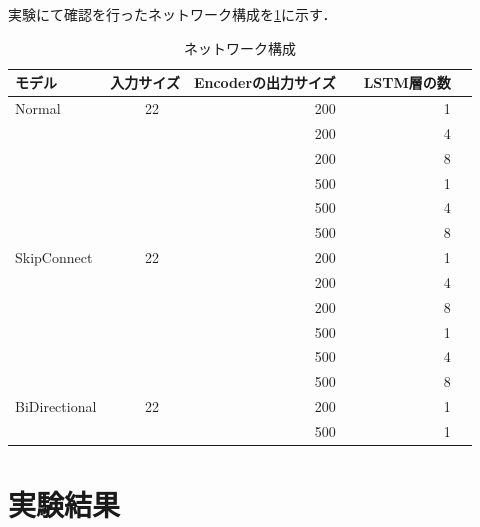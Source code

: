 \documentclass[a4paper,twocolumn]{jsarticle}
\begin{document}
実験にて確認を行ったネットワーク構成を\ref{tb:network_collection}に示す．
\begin{table}[H]
  \centering
  \caption{ネットワーク構成}
  \begingroup
  \begin{tabular}{|l|c|r|r|r|} \hline
    モデル & 入力サイズ & Encoderの出力サイズ &　LSTM層の数 \\ \hline \hline
    Normal&　22 & 200              &      1 \\
    &　         & 200              &      4 \\
    &　         & 200              &      8 \\
    &　         & 500              &      1 \\
    &　         & 500              &      4 \\
    &　         & 500              &      8 \\ \hline \hline
    SkipConnect&　22       & 200              &      1 \\
    &　         & 200              &      4 \\
    &　         & 200              &      8 \\
    &　         & 500              &      1 \\
    &　         & 500              &      4 \\
    &　         & 500              &      8 \\ \hline \hline
    BiDirectional&　22       & 200 &      1 \\
    &　         & 500              &      1 \\ \hline
  \end{tabular}

  \label{tb:network_collection}
  \endgroup
\end{table}


\section{実験結果} \label{sec:result}
\end{document}
